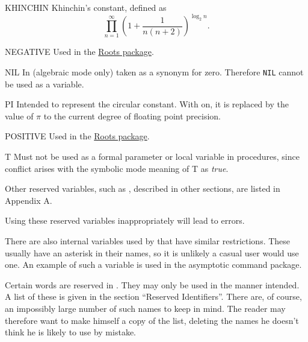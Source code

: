 \begin{list}{}
\item[KHINCHIN] Khinchin's constant, defined as
  \begin{displaymath}
    \prod_{n=1}^{\infty}\left(1+\frac{1}{n(n+2)}\right)^{\log_{2} n} .
  \end{displaymath}

\item[NEGATIVE] Used in the \hyperlink{package:ROOTS}{Roots package}.

\item[NIL] In {\REDUCE} (algebraic mode only)
taken as a synonym for zero.  Therefore \texttt{NIL} cannot be used as a
variable.

\item[PI] Intended to represent the circular
constant.  With  on, it is replaced by the value of $\pi$ to
the current degree of floating point precision.

\item[POSITIVE] Used in the \hyperlink{package:ROOTS}{Roots package}.

\item[T] Must not be used as a formal
parameter or local variable in procedures, since conflict arises with the
symbolic mode meaning of T as \emph{true}.
\end{list}

Other reserved variables, such as , described in other sections,
are listed in Appendix A.

Using these reserved variables inappropriately
will lead to errors.

There are also internal variables used by {\REDUCE} that have similar
restrictions. These usually have an asterisk in their names, so it is
unlikely a casual user would use one. An example of such a variable is
 used in the asymptotic command package.

Certain words are reserved in {\REDUCE}. They may only be used in the manner
intended. A list of these is given in the section ``Reserved Identifiers''.
There are, of course, an impossibly large number of such names to keep in
mind. The reader may therefore want to make himself a copy of the list,
deleting the names he doesn't think he is likely to use by mistake.

